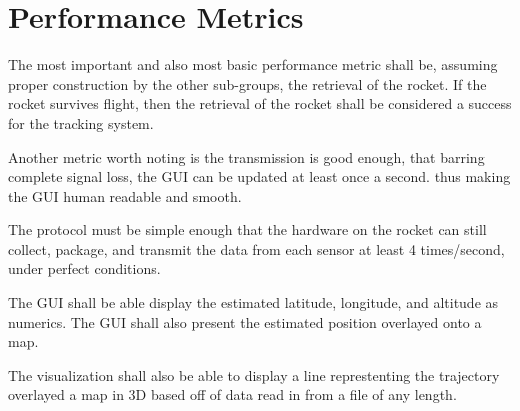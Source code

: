 \documentclass[onecolumn, draftclsnofoot,10pt, compsoc]{IEEEtran}
\begin{document}
\section{Performance Metrics}
The most important and also most basic performance metric shall be, assuming proper construction by the other sub-groups, the retrieval of the rocket. If the rocket survives flight, then the retrieval of the rocket shall be considered a success for the tracking system. \par 
Another metric worth noting is the transmission is good enough, that barring complete signal loss, the GUI can be updated at least once a second. thus making the GUI human readable and smooth.\par
 The protocol must be simple enough that the hardware on the rocket can still collect, package, and transmit the data from each sensor at least 4 times/second, under perfect conditions. \par
The GUI shall be able display the estimated latitude, longitude, and altitude as numerics. The GUI shall also present the estimated position overlayed onto a map. \par
The visualization shall also be able to display a line represtenting the trajectory overlayed a map in 3D based off of data read in from a file of any length. \par
\end{document}
